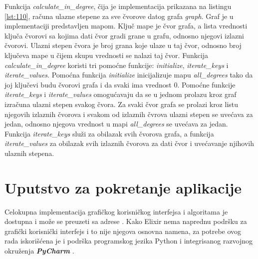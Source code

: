 \documentclass[12pt,oneside]{memoir}
\begin{document}
Funkcija \textit{calculate\_in\_degree}, čija je implementacija prikazana na listingu \ref{lst:110}, računa ulazne stepene za sve čvorove datog grafa \textit{graph}. Graf je u implementaciji predstavljen mapom. Ključ mape je čvor grafa, a lista vrednosti ključa čvorovi sa kojima dati čvor gradi grane u grafu, odnosno njegovi izlazni čvorovi. Ulazni stepen čvora je broj grana koje ulaze u taj čvor, odnosno broj ključeva mape u čijem skupu vrednosti se nalazi taj čvor. Funkcija \textit{calculate\_in\_degree} koristi tri pomoćne funkcije: \textit{initialize}, \textit{iterate\_keys} i \textit{iterate\_values}. Pomoćna funkcija \textit{initialize} inicijalizuje mapu \textit{all\_degrees} tako da joj ključevi budu čvorovi grafa i da svaki ima vrednost 0. Pomoćne funkcije \textit{iterate\_keys} i \textit{iterate\_values} omogućavaju da se u jednom prolazu kroz graf izračuna ulazni stepen svakog čvora. Za svaki čvor grafa se prolazi kroz listu njegovih izlaznih čvorova i svakom od izlaznih čvrova ulazni stepen se uvećava za jedan, odnosno njegova vrednost u mapi \textit{all\_degrees} se uvećava za jedan. Funkcija \textit{iterate\_keys} služi za obilazak svih čvorova grafa, a funkcija \textit{iterate\_values} za obilazak svih izlaznih čvorova za dati čvor i uvećavanje njihovih ulaznih stepena.



\section{Uputstvo za pokretanje aplikacije}

Celokupna implementacija grafičkog korisničkog interfejsa i algoritama je dostupna i može se preuzeti sa adrese \cite{GIT}.
Kako Elixir nema naprednu podršku za grafički korisnički interfejs i to nije njegova osnovna namena, za potrebe ovog rada iskorišćena je i podrška programskog jezika Python i integrisanog razvojnog okruženja \textbf{\textit{PyCharm}} \cite{PyCharm}.
\end{document}
